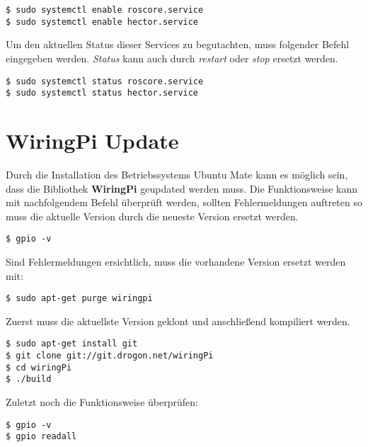 \begin{lstlisting}
$ sudo systemctl enable roscore.service
$ sudo systemctl enable hector.service
\end{lstlisting}

Um den aktuellen Status dieser Services zu begutachten, muss folgender Befehl eingegeben werden. \textit{Status} kann auch durch \textit{restart} oder \textit{stop} ersetzt werden.\\ 

\begin{lstlisting}
$ sudo systemctl status roscore.service
$ sudo systemctl status hector.service
\end{lstlisting}
\vspace{-1.1cm}









\section{WiringPi Update}

Durch die Installation des Betriebssystems Ubuntu Mate kann es möglich sein, dass die Bibliothek \textbf{WiringPi} geupdated werden muss. Die Funktionsweise kann mit nachfolgendem Befehl überprüft werden, sollten Fehlermeldungen auftreten so muss die aktuelle Version durch die neueste Version ersetzt werden.\\

\begin{lstlisting}
$ gpio -v
\end{lstlisting}
\vspace{-0.8cm}

Sind Fehlermeldungen ersichtlich, muss die vorhandene Version ersetzt werden mit: \\

\begin{lstlisting}
$ sudo apt-get purge wiringpi
\end{lstlisting}
\vspace{-0.8cm}

Zuerst muss die aktuellste Version geklont und anschließend kompiliert werden.\\

\begin{lstlisting}
$ sudo apt-get install git
$ git clone git://git.drogon.net/wiringPi
$ cd wiringPi
$ ./build
\end{lstlisting}
\vspace{-0.8cm}

Zuletzt noch die Funktionsweise überprüfen:\\

\begin{lstlisting}
$ gpio -v 
$ gpio readall
\end{lstlisting}
